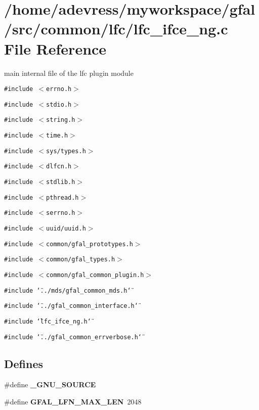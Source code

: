 \section{/home/adevress/myworkspace/gfal/src/common/lfc/lfc\_\-ifce\_\-ng.c File Reference}
\label{lfc__ifce__ng_8c}
main internal file of the lfc plugin module 

{\tt \#include $<$errno.h$>$}\par
{\tt \#include $<$stdio.h$>$}\par
{\tt \#include $<$string.h$>$}\par
{\tt \#include $<$time.h$>$}\par
{\tt \#include $<$sys/types.h$>$}\par
{\tt \#include $<$dlfcn.h$>$}\par
{\tt \#include $<$stdlib.h$>$}\par
{\tt \#include $<$pthread.h$>$}\par
{\tt \#include $<$serrno.h$>$}\par
{\tt \#include $<$uuid/uuid.h$>$}\par
{\tt \#include $<$common/gfal\_\-prototypes.h$>$}\par
{\tt \#include $<$common/gfal\_\-types.h$>$}\par
{\tt \#include $<$common/gfal\_\-common\_\-plugin.h$>$}\par
{\tt \#include \char`\"{}../mds/gfal\_\-common\_\-mds.h\char`\"{}}\par
{\tt \#include \char`\"{}../gfal\_\-common\_\-interface.h\char`\"{}}\par
{\tt \#include \char`\"{}lfc\_\-ifce\_\-ng.h\char`\"{}}\par
{\tt \#include \char`\"{}../gfal\_\-common\_\-errverbose.h\char`\"{}}\par
\subsection*{Defines}
\begin{CompactItemize}
\item 
\#define \textbf{\_\-GNU\_\-SOURCE}\label{lfc__ifce__ng_8c_53abf256730d533302d1910e5fb61efe}

\item 
\#define \textbf{GFAL\_\-LFN\_\-MAX\_\-LEN}~2048\label{lfc__ifce__ng_8c_74cbac9029a516b4ae28199debf71835}

\end{CompactItemize}
